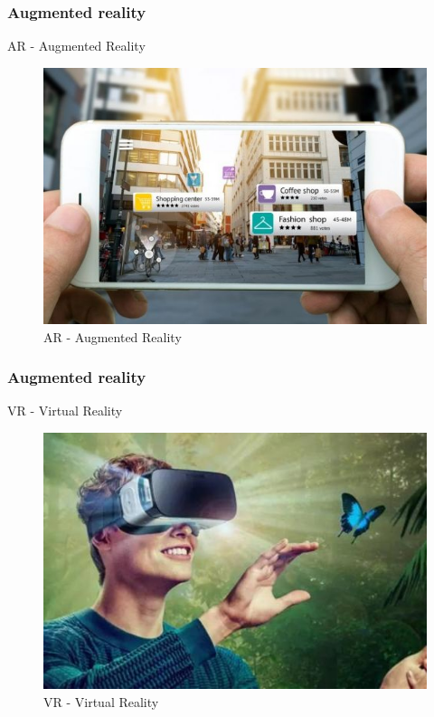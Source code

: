 \documentclass{beamer}
\begin{document}
\begin{frame}
  \frametitle{Augmented reality}
  AR - Augmented Reality
  \begin{figure}
    \begin{center}
      \includegraphics[width=0.7\linewidth]{images//AR.jpeg}
      \caption{AR - Augmented Reality}
      \label{Fig:4}
    \end{center}
  \end{figure}
\end{frame}

\begin{frame}
  \frametitle{Augmented reality}
  VR - Virtual Reality
  \begin{figure}
    \begin{center}
      \includegraphics[width=0.7\linewidth]{images//vr.jpg}
      \caption{VR - Virtual Reality}
      \label{Fig:5}
    \end{center}
  \end{figure}
\end{frame}
\end{document}

